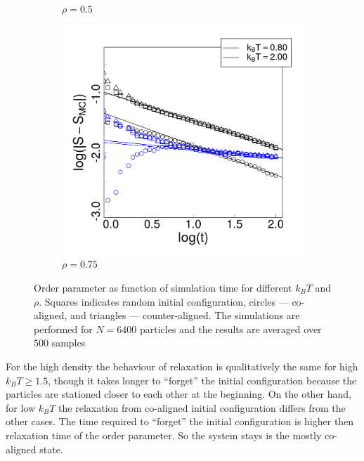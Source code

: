 \begin{figure}[h]
\begin{subfigure}[t]{0.32\textwidth}
	\captionsetup{justification=centering, width=0.9\columnwidth}
	\caption{$\rho = 0.5$}
\end{subfigure}
\begin{subfigure}[t]{0.32\textwidth}
	\centering
	\includegraphics[width=\textwidth]{Images/relax_75.png}
	\captionsetup{justification=centering, width=0.9\columnwidth}
	\caption{$\rho = 0.75$}
\end{subfigure}
\captionsetup{justification=centering, width=0.9\columnwidth}
\caption{Order parameter as function of simulation time for different $k_BT$ and $\rho$. Squares indicates random initial configuration, circles --- co-aligned, and triangles --- counter-aligned. The simulations are performed for $N = 6400$ particles and the results are averaged over $500$ samples}
\label{fig:short_time_order_parameter_different_density}
\end{figure}

For the high density the behaviour of relaxation is qualitatively the same for high $k_BT \ge 1.5$, though it takes longer to ``forget'' the initial configuration because the particles are stationed closer  to each other at the beginning. On the other hand, for low $k_BT$ the relaxation from co-aligned initial configuration differs from the other cases. The time required to ``forget'' the initial configuration is higher then relaxation time of the order parameter. So the system stays is the mostly co-aligned state.

